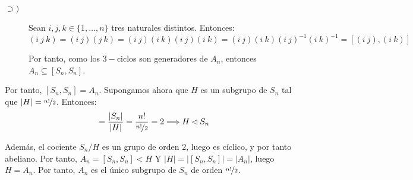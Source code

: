 \begin{ejercicio}
\begin{enumerate}
\begin{description}
            \item[$\supset)$] Sean $i,j,k\in \{1,\ldots,n\}$ tres naturales distintos. Entonces:
            \begin{equation*}
                (i\ j\ k) = (i\ j)(j\ k) = (i\ j)(i\ k)(i\ j)(i\ k)
                = (i\ j)(i\ k)(i\ j)^{-1}(i\ k)^{-1} = [(i\ j),(i\ k)]
            \end{equation*}

            Por tanto, como los $3-$ciclos son generadores de $A_n$, entonces $A_n\subseteq [S_n,S_n]$.
        \end{description}

        Por tanto, $[S_n,S_n]=A_n$. Supongamos ahora que $H$ es un subgrupo de $S_n$ tal que $|H|=\nicefrac{n!}{2}$. Entonces:
        \begin{equation*}
            [S_n : H] = \frac{|S_n|}{|H|} = \frac{n!}{\nicefrac{n!}{2}} = 2
            \Longrightarrow H\lhd S_n
        \end{equation*}

        Además, el cociente $S_n/H$ es un grupo de orden $2$, luego es cíclico, y por tanto abeliano. Por tanto, $A_n=[S_n,S_n]<H$ Y $|H|=|[S_n,S_n]|=|A_n|$, luego $H=A_n$. Por tanto, $A_n$ es el único subgrupo de $S_n$ de orden $\nicefrac{n!}{2}$.
    \end{enumerate}
\end{ejercicio}
